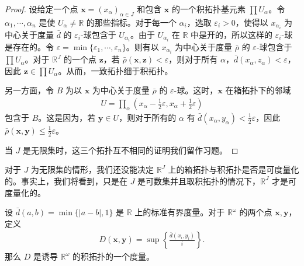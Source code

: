 \documentclass[../../main.tex]{subfiles}
\begin{document}
\begin{proof}
设给定一个点 $\boldsymbol{x} = (x_{\alpha})_{\alpha \in J}$ 和包含 $\boldsymbol{x}$ 的一个积拓扑基元素 $\prod U_{\alpha}$。令 $\alpha_{1}, \cdots, \alpha_{n}$ 是使 $U_{\alpha} \neq \mathbb{R}$ 的那些指标。对于每一个 $\alpha_{i}$，选取 $\varepsilon_{i} > 0$，使得以 $x_{\alpha_{i}}$ 为中心关于度量 $\bar{d}$ 的 $\varepsilon_{i}$-球包含于 $U_{\alpha_{i}}$。由于 $U_{\alpha_{i}}$ 在 $\mathbb{R}$ 中是开的，所以这样的 $\varepsilon_{i}$-球是存在的。令 $\varepsilon = \min \{\varepsilon_{1}, \cdots, \varepsilon_{n}\}$。则有以 $x_{\alpha_{i}}$ 为中心关于度量 $\bar{\rho}$ 的 $\varepsilon$-球包含于 $\prod U_{\alpha}$。对于 $\mathbb{R}^{J}$ 的一个点 $\boldsymbol{z}$，若 $\bar{\rho}(\boldsymbol{x}, \boldsymbol{z}) < \varepsilon$，则对于所有 $\alpha$，$\bar{d}(x_{\alpha}, z_{\alpha}) < \varepsilon$，因此 $\boldsymbol{z} \in \prod U_{\alpha}$。从而，一致拓扑细于积拓扑。

另一方面，令 $B$ 为以 $\boldsymbol{x}$ 为中心关于度量 $\bar{\rho}$ 的 $\varepsilon$-球。这时，$\boldsymbol{x}$ 在箱拓扑下的邻域
\begin{align*}
U = \prod_{\alpha} \left(x_{\alpha} - \frac{1}{2}\varepsilon, x_{\alpha} + \frac{1}{2}\varepsilon\right)
\end{align*}
包含于 $B$。这是因为，若 $\boldsymbol{y} \in U$，则对于所有的 $\alpha$ 有 $\bar{d}(x_{\alpha}, y_{\alpha}) < \frac{1}{2}\varepsilon$，因此 $\bar{\rho}(\boldsymbol{x}, \boldsymbol{y}) \leqslant \frac{1}{2}\varepsilon$。

当 $J$ 是无限集时，这三个拓扑互不相同的证明我们留作习题。
\end{proof}

对于 $J$ 为无限集的情形，我们还没能决定 $\mathbb{R}^{J}$ 上的箱拓扑与积拓扑是否是可度量化的。事实上，我们将看到，只是在 $J$ 是可数集并且取积拓扑的情况下，$\mathbb{R}^{J}$ 才是可度量化的。

\begin{theorem}\label{theorem:ch02-Romega度量}
设 $\bar{d}(a, b) = \min \{|a - b|, 1\}$ 是 $\mathbb{R}$ 上的标准有界度量。对于 $\mathbb{R}^{\omega}$ 的两个点 $\boldsymbol{x}, \boldsymbol{y}$，定义
\begin{align*}
D(\boldsymbol{x}, \boldsymbol{y}) = \sup \left\{\frac{\bar{d}(x_{i}, y_{i})}{i}\right\}.
\end{align*}
那么 $D$ 是诱导 $\mathbb{R}^{\omega}$ 的积拓扑的一个度量。
\end{theorem}
\end{document}
